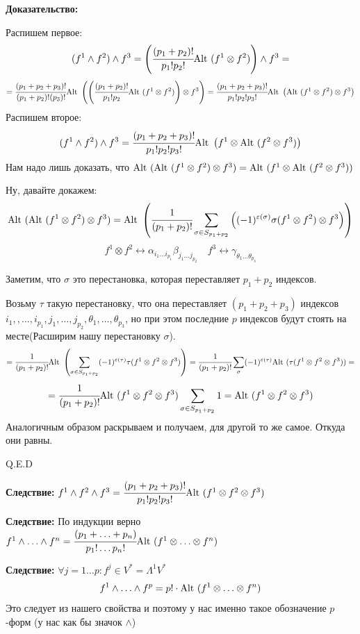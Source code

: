 \begin{enumerate}
    \textbf{Доказательство:}

    Распишем первое:
    $$(f^1 \wedge f^2)\wedge f^3 = \left(\cfrac{(p_1+p_2)!}{p_1! p_2!}\text{Alt } (f^1 \otimes f^2)\right)\wedge f^3 =$$  $$=\cfrac{(p_1 + p_2 + p_3)!}{(p_1+p_2)!(p_3)!} \text{Alt }\left(\left(\cfrac{(p_1+p_2)!}{p_1! p_2} \text{Alt } (f^1 \otimes f^2)\right)\otimes f^3 \right) = \cfrac{(p_1+p_2+p_3)!}{p_1!p_2!p_3!} \text{Alt } \left( \text{Alt }(f^1 \otimes f^2) \otimes f^3 \right)$$
    Распишем второе:
    $$(f^1 \wedge f^2)\wedge f^3 = \cfrac{(p_1+p_2+p_3)!}{p_1!p_2!p_3!} \text{Alt } \left( f^1 \otimes \text{Alt }(f^2 \otimes f^3) \right)$$
    Нам надо лишь доказать, что $\text{Alt }(\text{Alt }(f^1 \otimes f^2)\otimes f^3) = \text{Alt } (f^1 \otimes \text{Alt } (f^2 \otimes f^3))$

    Ну, давайте докажем:
    $$\text{Alt }(\text{Alt }(f^1 \otimes f^2)\otimes f^3) = \text{Alt } \left(\cfrac{1}{(p_1+p_2)!} \sum\limits_{\sigma \in S_{p_1+p_2}}\left((-1)^{\varepsilon(\sigma)}\sigma(f^1\otimes f^2)\otimes f^3\right)\right) $$
    $$f^1 \otimes f^2 \leftrightarrow \alpha_{i_1\ldots i_{p_1}}\beta_{j_1\ldots j_{p_2}} \quad f^3 \leftrightarrow \gamma_{\theta_1\ldots \theta_{p_3}}$$

    Заметим, что $\sigma $ это перестановка, которая переставляет $p_1 + p_2$ индексов.

    Возьму $\tau$ такую перестановку, что она переставляет $(p_1+p_2+p_3)$ индексов $i_1,,\ldots, i_{p_1},j_1,\ldots, j_{p_2},\theta_1,\ldots,\theta_{p_3}$, но при этом последние $p$ индексов будут стоять на месте(Расширим нашу перестановку $\sigma$).
    $$= \cfrac{1}{(p_1+p_2)!}\text{Alt }\left(\sum_{\sigma \in S_{p_1+p_2}}(-1)^{\varepsilon(\tau)}\tau(f^1 \otimes f^2 \otimes f^3)\right) = \cfrac{1}{(p_1+p_2)!}\sum\limits_{\sigma} (-1)^{\varepsilon(\tau)}\text{Alt }(\tau(f^1 \otimes f^2 \otimes f^3)) =$$$$= \cfrac{1}{(p_1+p_2)!}\text{Alt } (f^1 \otimes f^2 \otimes f^3)\sum\limits_{\sigma \in S_{p_1+p_2}}1 = \text{Alt } (f^1 \otimes f^2 \otimes f^3)$$
    Аналогичным образом раскрываем и получаем, для другой то же самое. Откуда они равны.


    \hfill Q.E.D

    \textbf{Следствие:} $f^1 \wedge f^2 \wedge f^3 = \cfrac{(p_1 + p_2 + p_3)!}{p_1!p_2!p_3!}\text{Alt } (f^1 \otimes f^2 \otimes f^3)$

    \textbf{Следствие:} По индукции верно $f^1 \wedge \ldots \wedge f^n = \cfrac{(p_1 +\ldots +  p_n)}{p_1!\ldots p_n!} \text{Alt } (f^1 \otimes \ldots \otimes f^n)$

    \textbf{Следствие:} $\forall j = 1 \ldots p: f^j\in V^* = \Lambda^1 V^*$
    $$f^1\wedge \ldots \wedge f^p = p!\cdot \text{Alt }(f^1 \otimes \ldots \otimes f^n)$$
    Это следует из нашего свойства и поэтому у нас именно такое обозначение $p$-форм (у нас как бы значок $\wedge$)


\end{enumerate}
